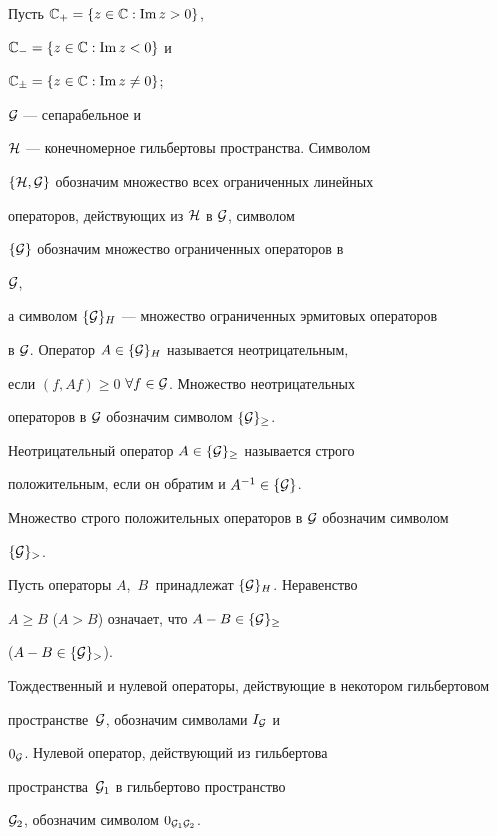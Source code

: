 Пусть ${\Bbb C}_+=\{z\in {\Bbb C}:\operatorname{Im} z>0\}$,


${\Bbb C}_-=\{z\in {\Bbb C}:\operatorname{Im} z<0\}$ и


${\Bbb C}_{\pm}=\{z\in {\Bbb C}:\operatorname{Im} z\ne 0\}$;


${{\cal G}}$ --- сепарабельное и


$\cal H$ --- конечномерное гильбертовы пространства. Символом


$\{{\cal H},{\cal G}\}$ обозначим множество всех ограниченных линейных


операторов, действующих из ${\cal H}$ в ${\cal G}$, символом


$\{{\cal G}\}$ обозначим множество ограниченных операторов в


${\cal G}$,


а символом $\{{\cal G}\}_{H}$ --- множество ограниченных эрмитовых операторов


в ${\cal G}$. Оператор $A\in \{{\cal G}\}_{H}$ называется неотрицательным,


если $(f,Af)\ge 0$ $\forall f\in {\cal G}$. Множество неотрицательных


операторов в ${\cal G}$ обозначим символом $\{{\cal G}\}_\ge$.


Неотрицательный оператор $A\in \{{\cal G} \}_\ge $ называется строго


положительным, если он обратим и $A^{-1}\in \{ {\cal G} \}$.


Множество строго положительных операторов в ${\cal G}$ обозначим символом


$\{{\cal G} \}_>$.


Пусть операторы $A$,~$B~$ принадлежат $\{{\cal G}\}_{H}$. Неравенство


$ A\ge B $ ($A>B$) означает, что $A-B\in \{{\cal G}\}_{\ge}$


($A-B\in \{{\cal G}\}_{>}$).





Тождественный и нулевой операторы, действующие в некотором гильбертовом


пространстве~${\cal G}$, обозначим символами $I_{{\cal G}}$ и


$0_{{\cal G}}$. Нулевой оператор, действующий из гильбертова


пространства~${\cal G}_1$ в гильбертово пространство


${\cal G}_2$, обозначим символом $0_{{\cal G}_1{\cal G}_2}$.





